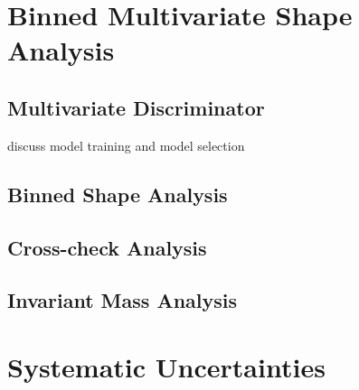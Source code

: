 \section{Binned Multivariate Shape Analysis}

\subsection{Multivariate Discriminator}

discuss model training and model selection

\subsection{Binned Shape Analysis}

\subsection{Cross-check Analysis}

\subsection{Invariant Mass Analysis}

\section{Systematic Uncertainties}

%
%
%
%
